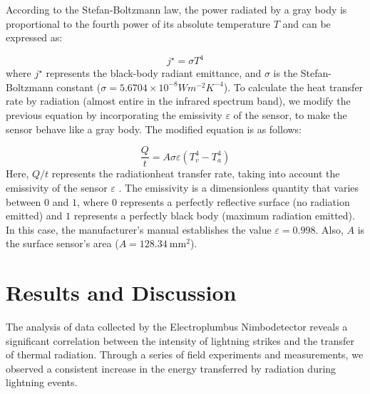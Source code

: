 \documentclass[english]{cenarticle}
\begin{document}
According to the Stefan-Boltzmann law, the power radiated by a gray body is proportional to the fourth power of its absolute temperature $T$ and can be expressed as:

\begin{equation}\label{StefanBoltzmannLaw}
  j^{\star}=\sigma T^{4}
\end{equation}
%
\noindent where $j^{\star}$ represents the black-body radiant emittance, and $\sigma$ is the Stefan-Boltzmann constant ($\sigma=5.6704\times10^{-8} Wm^{-2}K^{-4}$).
%
To calculate the heat transfer rate by radiation (almost entire in the infrared spectrum band), we modify the previous equation by incorporating the emissivity $\varepsilon$ of the sensor, to make the sensor behave like a gray body. The modified equation is as follows:

\begin{equation}
  \frac{Q}{t}=A\sigma\varepsilon (T_{v}^{4} - T_{a}^{4})
\end{equation}
%
Here, $Q \slash t$ represents the radiationheat transfer rate, taking into account the emissivity of the sensor $\varepsilon$ . The emissivity is a dimensionless quantity that varies between $0$ and $1$, where $0$ represents a perfectly reflective surface (no radiation emitted) and $1$ represents a perfectly black body (maximum radiation emitted). In this case, the manufacturer's manual establishes the value $\varepsilon = 0.998$. Also, $A$ is the surface sensor's area ($A=\SI{128.34}{\milli\meter^2}$).

\section{Results and Discussion}

The analysis of data collected by the Electroplumbus Nimbodetector reveals a significant correlation between the intensity of lightning strikes and the transfer of thermal radiation. Through a series of field experiments and measurements, we observed a consistent increase in the energy transferred by radiation during lightning events.


 
\end{document}
